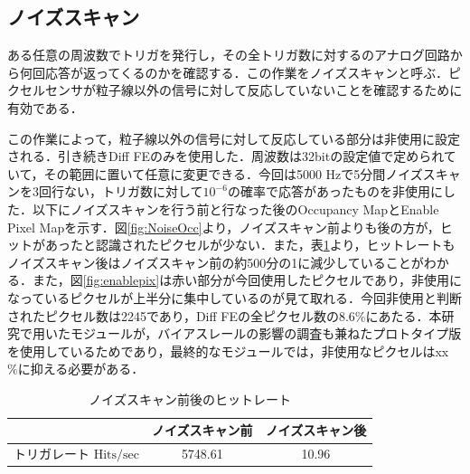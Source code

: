 \subsection{ノイズスキャン}
ある任意の周波数でトリガを発行し，その全トリガ数に対するのアナログ回路から何回応答が返ってくるのかを確認する．この作業をノイズスキャンと呼ぶ．ピクセルセンサが粒子線以外の信号に対して反応していないことを確認するために有効である．\par
この作業によって，粒子線以外の信号に対して反応している部分は非使用に設定される．引き続きDiff FEのみを使用した．周波数は32bitの設定値で定められていて，その範囲に置いて任意に変更できる．今回は5000 $\mathrm{Hz}$で5分間ノイズスキャンを3回行ない，トリガ数に対して$10^{-6}$の確率で応答があったものを非使用にした．以下にノイズスキャンを行う前と行なった後のOccupancy MapとEnable Pixel Mapを示す．図\ref{fig:NoiseOcc}より，ノイズスキャン前よりも後の方が，ヒットがあったと認識されたピクセルが少ない．また，表\ref{tab:noisehitrate}より，ヒットレートもノイズスキャン後はノイズスキャン前の約500分の1に減少していることがわかる．また，図\ref{fig:enablepix}は赤い部分が今回使用したピクセルであり，非使用になっているピクセルが上半分に集中しているのが見て取れる．今回非使用と判断されたピクセル数は2245であり，Diff FEの全ピクセル数の8.6\%にあたる．本研究で用いたモジュールが，バイアスレールの影響の調査も兼ねたプロトタイプ版を使用しているためであり，最終的なモジュールでは，非使用なピクセルはxx $\mathrm{\%}$に抑える必要がある．

%


\begin{table}[h]
  \centering
  \caption{ノイズスキャン前後のヒットレート}
  \begin{tabular} {l|cc} \hline
     & ノイズスキャン前 & ノイズスキャン後 \\ \hline
    トリガレート $\mathrm{Hits/sec}$ & 5748.61 & 10.96 \\ \hline
  \end{tabular}
  \label{tab:noisehitrate}
\end{table}

